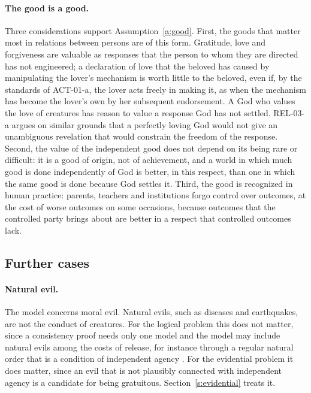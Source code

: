 \documentclass{situationist-preprint}
\begin{document}
\paragraph{The good is a good.} Three considerations support Assumption~\ref{a:good}. First, the goods that matter most in relations between persons are of this form. Gratitude, love and forgiveness are valuable as responses that the person to whom they are directed has not engineered; a declaration of love that the beloved has caused by manipulating the lover's mechanism is worth little to the beloved, even if, by the standards of ACT-01-a, the lover acts freely in making it, as when the mechanism has become the lover's own by her subsequent endorsement. A God who values the love of creatures has reason to value a response God has not settled. REL-03-a argues on similar grounds that a perfectly loving God would not give an unambiguous revelation that would constrain the freedom of the response. Second, the value of the independent good does not depend on its being rare or difficult: it is a good of origin, not of achievement, and a world in which much good is done independently of God is better, in this respect, than one in which the same good is done because God settles it. Third, the good is recognized in human practice: parents, teachers and institutions forgo control over outcomes, at the cost of worse outcomes on some occasions, because outcomes that the controlled party brings about are better in a respect that controlled outcomes lack.

\subsection{Further cases}

\paragraph{Natural evil.} The model concerns moral evil. Natural evils, such as diseases and earthquakes, are not the conduct of creatures. For the logical problem this does not matter, since a consistency proof needs only one model and the model may include natural evils among the costs of release, for instance through a regular natural order that is a condition of independent agency \citep{Swinburne1998}. For the evidential problem it does matter, since an evil that is not plausibly connected with independent agency is a candidate for being gratuitous. Section~\ref{s:evidential} treats it.
\end{document}
